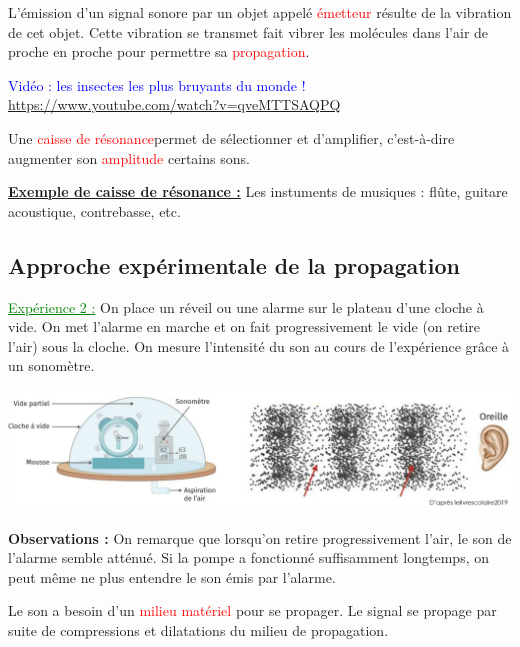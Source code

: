 \begin{tcolorbox}[colback=red!5!white,colframe=red!75!black,title=\textbf{Propriété de l'émission d'un son : }]
L'émission d'un signal sonore par un objet appelé \textcolor{red}{émetteur} résulte de la vibration de cet objet. Cette vibration se transmet fait vibrer les molécules dans l'air de proche en proche pour permettre sa \textcolor{red}{propagation}.
\end{tcolorbox}

\textcolor{blue}{Vidéo : les insectes les plus bruyants du monde !} \url{https://www.youtube.com/watch?v=qveMTTSAQPQ}
\begin{tcolorbox}[colback=red!5!white,colframe=red!75!black,title=\textbf{Caisse de résonance : }]
Une \textcolor{red}{caisse de résonance}permet de sélectionner et d'amplifier, c'est-à-dire augmenter son \textcolor{red}{amplitude} certains sons.
\end{tcolorbox}

\textbf{\underline{Exemple de caisse de résonance :}} Les instuments de musiques : flûte, guitare acoustique, contrebasse, etc.


\subsection{Approche expérimentale de la propagation}
\textcolor{green}{\underline{Expérience 2 :}} On place un réveil ou une alarme sur le plateau d'une cloche à vide. On met l'alarme en marche et on fait progressivement le vide (on retire l'air) sous la cloche. On mesure l'intensité du son au cours de l'expérience grâce à un sonomètre.
\begin{center}
    \includegraphics[scale=0.57]{Images/Cours/Chapitre_3/Propagation_exp.png}
\end{center}

\textbf{Observations :} On remarque que lorsqu'on retire progressivement l'air, le son de l'alarme semble atténué. Si la pompe a fonctionné suffisamment longtemps, on peut même ne plus entendre le son émis par l'alarme.

\begin{tcolorbox}[colback=red!5!white,colframe=red!75!black,title=\textbf{Propriété de la propagation du son : }]
Le son a besoin d'un \textcolor{red}{milieu matériel} pour se propager. Le signal se propage par suite de compressions et dilatations du milieu de propagation.
\end{tcolorbox}

